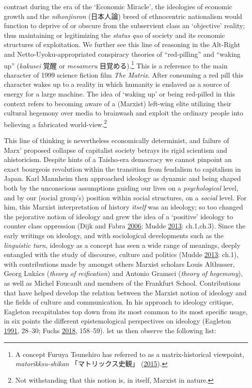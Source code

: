 \documentclass[10pt,british,A4paper,,openany]{memoir}
\begin{document}
contrast during the era of the `Economic Miracle', the ideologies of
economic growth and the \emph{nihonjinron} (日本人論) breed of
ethnocentric nationalism would function to deprive of or obscure from
the subservient class an `objective' reality; thus maintaining or
legitimizing the \emph{status quo} of society and its economic
structures of exploitation. We further see this line of reasoning in the
Alt-Right and Netto-Uyoku-appropriated conspiracy theories of
``red-pilling'' and ``waking up'' (\emph{kakusei} 覚醒 or
\emph{mesameru} 目覚める).\footnote{A concept Furuya Tsunehiro has
  referred to as a matrix-historical viewpoint, \emph{matorikksu-shikan}
  「マトリックス史観」 (\protect\hyperlink{ref-furuya_eng._2015}{2015}).}
This is a reference to the main character of 1999 science fiction film
\emph{The Matrix}. After consuming a red pill this character wakes up to
a reality in which humanity is enslaved as a source of energy for a
large machine. The idea of `waking up' or being red-pilled in this
context refers to becoming aware of a (Marxist) left-wing elite
utilizing their cultural hegemony over media to brainwash and exploit
the ordinary people into believing a fabricated world-view.\footnote{Not
  withstanding that this notion is, in itself, Marxist in nature.}

This line of thinking is nevertheless economically determinist, and
failure of Marx' proposed collapse of capitalist society betrays its
rigid scientism and ahistoricism. Despite hints of a Taisho-era
democracy we cannot pinpoint an exact bourgeois revolution within the
transition from feudalism to capitalism in Japan. Karl Mannheim then
approached ideology as dynamic and being shaped both by the unconscious
assumptions guiding our lives on a \emph{psychological} level, and by
our (social group's) position within social structures, on a
\emph{social} level. For him, this Marxist interpretation of history
\emph{itself} was an ideology; so too changed the pejorative notion of
ideology and grew the idea of a `positive' ideology to counter class
oppression (Dijk and Fabra
\protect\hyperlink{ref-van_dijk_politics_2006}{2006}; Mudde
\protect\hyperlink{ref-mudde_oxford_2013}{2013}: ch.1,ch.3). Since the
early writings on ideology, and with sociological developments such as
the \emph{linguistic turn}, ideology as a concept has seen a wide range
of meanings, deeply entangled with the study of discourse, culture and
politics (Mudde \protect\hyperlink{ref-mudde_oxford_2013}{2013}: ch.1),
with contributions made by amongst others Marxist scholars Louis
Althusser, Georg Lukács (\emph{theory of reification}) and Antonio
Gramsci (\emph{theory of hegemony}), as well as Michel Foucault and
members of the Frankfurt School. Contributions that have helped develop
the relation between the Marxist notion of ideology and the fields of
culture and communication. In his approach to ideology critique,
Eagleton recapitulates top down from its most common to its most
specific usage, in six points the different epistemological perspectives
on ideology (Eagleton
\protect\hyperlink{ref-eagleton_ideology:_1991}{1991}, 28--30; Fuchs
\protect\hyperlink{ref-fuchs_racism_2018}{2018}, 158--59). let us then
observe the following list:
\end{document}
